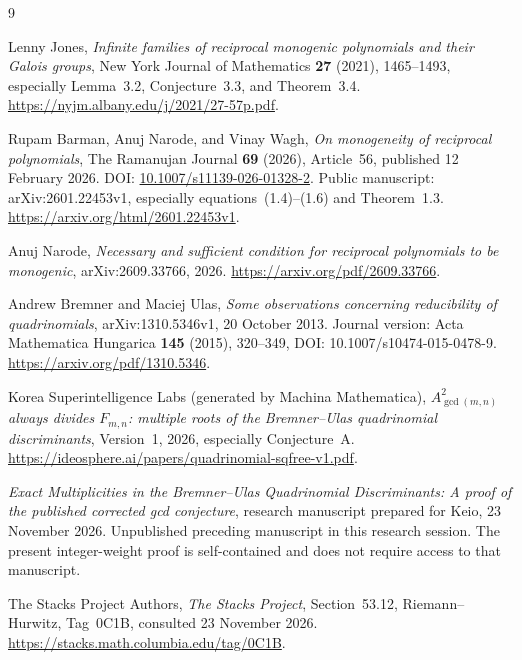 \documentclass[11pt,a4paper]{article}
\theoremstyle{definition}
\theoremstyle{remark}
\begin{document}
\begin{thebibliography}{9}

Lenny Jones,
\emph{Infinite families of reciprocal monogenic polynomials and
their Galois groups},
New York Journal of Mathematics \textbf{27} (2021), 1465--1493,
especially Lemma~3.2, Conjecture~3.3, and Theorem~3.4.
\url{https://nyjm.albany.edu/j/2021/27-57p.pdf}.

Rupam Barman, Anuj Narode, and Vinay Wagh,
\emph{On monogeneity of reciprocal polynomials},
The Ramanujan Journal \textbf{69} (2026), Article~56,
published 12 February 2026.
DOI: \href{https://doi.org/10.1007/s11139-026-01328-2}{10.1007/s11139-026-01328-2}.
Public manuscript: arXiv:2601.22453v1, especially
equations~(1.4)--(1.6) and Theorem~1.3.
\url{https://arxiv.org/html/2601.22453v1}.

Anuj Narode,
\emph{Necessary and sufficient condition for reciprocal polynomials
to be monogenic}, arXiv:2609.33766, 2026.
\url{https://arxiv.org/pdf/2609.33766}.

Andrew Bremner and Maciej Ulas,
\emph{Some observations concerning reducibility of quadrinomials},
arXiv:1310.5346v1, 20 October 2013.
Journal version: Acta Mathematica Hungarica \textbf{145} (2015),
320--349, DOI: 10.1007/s10474-015-0478-9.
\url{https://arxiv.org/pdf/1310.5346}.

Korea Superintelligence Labs (generated by Machina Mathematica),
\emph{$A_{\gcd(m,n)}^2$ always divides $F_{m,n}$: multiple roots of
the Bremner--Ulas quadrinomial discriminants}, Version~1, 2026,
especially Conjecture~A.
\url{https://ideosphere.ai/papers/quadrinomial-sqfree-v1.pdf}.

\emph{Exact Multiplicities in the Bremner--Ulas Quadrinomial
Discriminants: A proof of the published corrected gcd conjecture},
research manuscript prepared for Keio, 23 November 2026.
Unpublished preceding manuscript in this research session.
The present integer-weight proof is self-contained and does not
require access to that manuscript.

The Stacks Project Authors,
\emph{The Stacks Project}, Section~53.12, Riemann--Hurwitz,
Tag~0C1B, consulted 23 November 2026.
\url{https://stacks.math.columbia.edu/tag/0C1B}.

\end{thebibliography}
\end{document}
